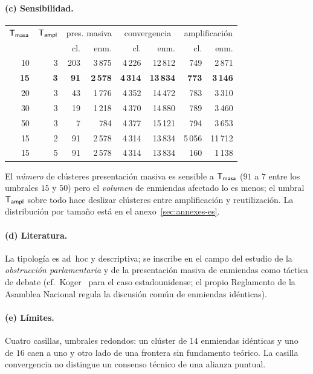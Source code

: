 \paragraph{(c) Sensibilidad.}
\begin{center}\small
\begin{tabular}{rr rr rr rr}
\toprule
$\mathsf{T_{masa}}$ & $\mathsf{T_{ampl}}$ & \multicolumn{2}{c}{pres. masiva} & \multicolumn{2}{c}{convergencia} & \multicolumn{2}{c}{amplificación} \\
 & & cl. & enm. & cl. & enm. & cl. & enm. \\
\midrule
10 & 3 & 203 & 3\,875 & 4\,226 & 12\,812 & 749 & 2\,871 \\
\textbf{15} & \textbf{3} & \textbf{91} & \textbf{2\,578} & \textbf{4\,314} & \textbf{13\,834} & \textbf{773} & \textbf{3\,146} \\
20 & 3 & 43 & 1\,776 & 4\,352 & 14\,472 & 783 & 3\,310 \\
30 & 3 & 19 & 1\,218 & 4\,370 & 14\,880 & 789 & 3\,460 \\
50 & 3 & \phantom{0}7 & \phantom{0,}784 & 4\,377 & 15\,121 & 794 & 3\,653 \\
\midrule
15 & 2 & 91 & 2\,578 & 4\,314 & 13\,834 & 5\,056 & 11\,712 \\
15 & 5 & 91 & 2\,578 & 4\,314 & 13\,834 & 160 & 1\,138 \\
\bottomrule
\end{tabular}
\end{center}
El \emph{número} de clústeres \og{}presentación masiva\fg{} es sensible a
$\mathsf{T_{masa}}$ ($91$ a $7$ entre los umbrales $15$ y $50$) pero el
\emph{volumen} de enmiendas afectado lo es menos; el umbral $\mathsf{T_{ampl}}$
sobre todo hace deslizar clústeres entre \og{}amplificación\fg{} y
\og{}reutilización\fg{}. La distribución por tamaño está en el
anexo~\ref{sec:annexes-es}.

\paragraph{(d) Literatura.} La tipología es ad~hoc y descriptiva; se inscribe en el
campo del estudio de la \emph{obstrucción parlamentaria} y de la presentación
masiva de enmiendas como táctica de debate (cf.~Koger~\cite{koger2010} para el caso
estadounidense; el propio Reglamento de la Asamblea Nacional regula la
\og{}discusión común\fg{} de enmiendas idénticas).

\paragraph{(e) Límites.} Cuatro casillas, umbrales redondos: un clúster de $14$
enmiendas idénticas y uno de $16$ caen a uno y otro lado de una frontera sin
fundamento teórico. La casilla \og{}convergencia\fg{} no distingue un consenso
técnico de una alianza puntual.

